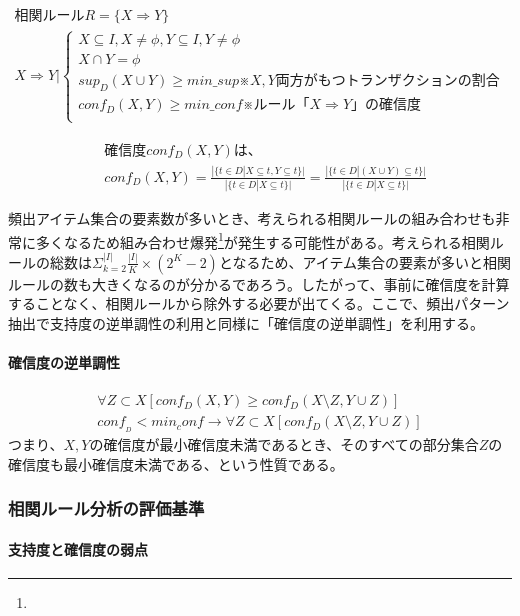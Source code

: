 \documentclass[dvipdfmx]{jsarticle}
\begin{document}
\begin{gather*}
  相関ルールR = \{ X \Rightarrow Y \} \\
  X \Rightarrow Y |
  \begin{cases}
    {X \subseteq I, X \neq \phi , Y \subseteq I, Y \neq \phi} \\
    {X \cap Y = \phi} \\
    {sup_{D}(X\cup Y) \geq min\_sup}　※X,Y両方がもつトランザクションの割合\\
    {conf_{D}(X, Y) \geq min\_conf}　※ルール「X \Rightarrow Y」の確信度\\
  \end{cases}
\end{gather*}
\begin{fleqn}
  \begin{align*}
    &確信度conf_{D}(X, Y)は、\\
    &conf_{D}(X, Y) = \frac{|\{t\in D |X \subseteq t, Y \subseteq t\}|}{|\{ t\in D | X \subseteq t\}|}
    = \frac{|\{ t \in D | (X\cup Y) \subseteq t\}|}{|\{ t \in D | X \subseteq t\}|}
  \end{align*}
\end{fleqn}
頻出アイテム集合の要素数が多いとき、考えられる相関ルールの組み合わせも非常に多くなるため組み合わせ爆発\footnote{}が発生する可能性がある。考えられる相関ルールの総数は$\Sigma_{k=2}^{|I|}\frac{|I|}{K}\times (2^{K}-2)$となるため、アイテム集合の要素が多いと相関ルールの数も大きくなるのが分かるであろう。したがって、事前に確信度を計算することなく、相関ルールから除外する必要が出てくる。ここで、頻出パターン抽出で支持度の逆単調性の利用と同様に「確信度の逆単調性」を利用する。
\paragraph{確信度の逆単調性}
\begin{gather*}
  \forall Z \subset X[ conf_{D}(X, Y) \geq conf_{D}(X \setminus Z, Y \cup Z)] \\
  conf__{D} < min_conf \rightarrow \forall Z \subset X[conf_{D}(X \setminus Z, Y \cup Z)]
\end{gather*}
つまり、$X, Y$の確信度が最小確信度未満であるとき、そのすべての部分集合$Z$の確信度も最小確信度未満である、という性質である。
\subsubsection{相関ルール分析の評価基準}
\paragraph{支持度と確信度の弱点}
\end{document}
